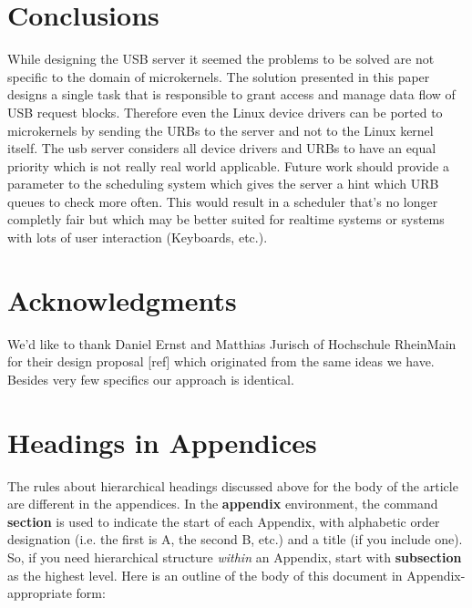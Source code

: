 \documentclass{acm_proc_article-sp}
\begin{document}
\section{Conclusions}
While designing the USB server it seemed the problems to be
solved are not specific to the domain of microkernels.
The solution presented in this paper designs a single task
that is responsible to grant access and manage data flow
of USB request blocks.
Therefore even the Linux device drivers can be ported
to microkernels by sending the URBs to the server and not to
the Linux kernel itself.
The usb server considers all device drivers and URBs to have
an equal priority which is not really real world applicable.
Future work should provide a parameter to the scheduling system
which gives the server a hint which URB queues to check
more often.
This would result in a scheduler that's no longer completly
fair but which may be better suited for realtime systems or
systems with lots of user interaction (Keyboards, etc.).

\section{Acknowledgments}
We'd like to thank Daniel Ernst and Matthias Jurisch
of Hochschule RheinMain for their design proposal [ref]
which originated from the same ideas we have.
Besides very few specifics our approach is identical.

%

%
%
\appendix
\section{Headings in Appendices}
The rules about hierarchical headings discussed above for
the body of the article are different in the appendices.
In the \textbf{appendix} environment, the command
\textbf{section} is used to
indicate the start of each Appendix, with alphabetic order
designation (i.e. the first is A, the second B, etc.) and
a title (if you include one).  So, if you need
hierarchical structure
\textit{within} an Appendix, start with \textbf{subsection} as the
highest level. Here is an outline of the body of this
document in Appendix-appropriate form:
\end{document}

